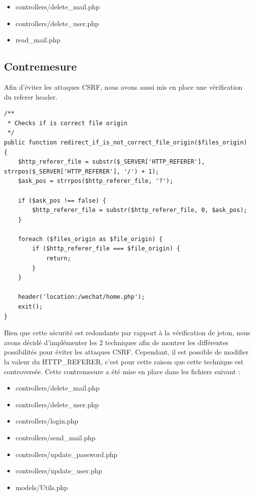 \documentclass[12pt]{article}
\begin{document}
\begin{itemize}
\item controllers/delete\_mail.php
\item controllers/delete\_user.php
\item read\_mail.php
\end{itemize}

\newpage
\subsection{Contremesure}\label{c4_2}

Afin d'éviter les attaques CSRF, nous avons aussi mis en place une vérification du referer header. 

\begin{lstlisting}[style=JAVA]
/**
 * Checks if is correct file origin
 */
public function redirect_if_is_not_correct_file_origin($files_origin) {
    $http_referer_file = substr($_SERVER['HTTP_REFERER'], strrpos($_SERVER['HTTP_REFERER'], '/') + 1);
    $ask_pos = strrpos($http_referer_file, '?');

    if ($ask_pos !== false) {
        $http_referer_file = substr($http_referer_file, 0, $ask_pos);
    }
    
    foreach ($files_origin as $file_origin) {
        if ($http_referer_file === $file_origin) {
            return;
        }
    }

    header('location:/wechat/home.php');
    exit();
}
\end{lstlisting}

Bien que cette sécurité est redondante par rapport à la vérification de jeton, nous avons décidé d'implémenter les 2 techniques afin de montrer les différentes possibilités pour éviter les attaques CSRF. Cependant, il est possible de modifier la valeur du HTTP\_REFERER, c'est pour cette raison que cette technique est controversée.
Cette contremesure a été mise en place dans les fichiers suivant :

\begin{itemize}
\item controllers/delete\_mail.php
\item controllers/delete\_user.php
\item controllers/login.php
\item controllers/send\_mail.php
\item controllers/update\_password.php
\item controllers/update\_user.php
\item models/Utils.php
\end{itemize}
\end{document}
